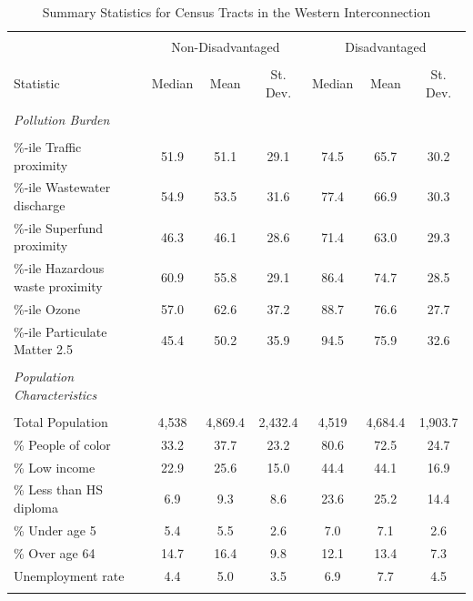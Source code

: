 \begin{table}[!htbp] \centering 
    \caption{Summary Statistics for Census Tracts in the Western Interconnection \label{dac_summary}} 
    \footnotesize
  \begin{tabular}{@{\extracolsep{3pt}}lcccccc} 
  \\[-1.8ex]\hline 
  \hline \\[-1.8ex] 
  & \multicolumn{3}{c}{Non-Disadvantaged} & \multicolumn{3}{c}{Disadvantaged} \\
    \cline{2-4} \cline{5-7}\\
  Statistic & Median & Mean & St. Dev. & Median & Mean & St. Dev.\\ 
  \hline \\ [-.8ex] 
    \emph{Pollution Burden} \\
    \hline \\[-.8ex]
    \%-ile Traffic proximity & 51.9 & 51.1 & 29.1 & 74.5 & 65.7 & 30.2 \\ 
    \%-ile Wastewater discharge & 54.9 & 53.5 & 31.6 & 77.4 & 66.9 & 30.3 \\  
    \%-ile Superfund proximity & 46.3 & 46.1 & 28.6 & 71.4 & 63.0 & 29.3 \\
    \%-ile Hazardous waste proximity & 60.9 & 55.8 & 29.1 & 86.4 & 74.7 & 28.5 \\ 
    \%-ile Ozone & 57.0 & 62.6 & 37.2  & 88.7 & 76.6 & 27.7 \\  
    \%-ile Particulate Matter 2.5 & 45.4 & 50.2 & 35.9  & 94.5 & 75.9 & 32.6 \\ \\[-.8ex]
    \emph{Population Characteristics} \\
    \hline \\[-.8ex]
    Total Population & 4,538 & 4,869.4 & 2,432.4 & 4,519 & 4,684.4 & 1,903.7 \\ 
    \% People of color & 33.2 & 37.7 & 23.2 & 80.6 & 72.5 & 24.7 \\  
    \% Low income & 22.9 & 25.6 & 15.0 & 44.4 & 44.1 & 16.9 \\ 
    \% Less than HS diploma & 6.9 & 9.3 & 8.6 & 23.6 & 25.2 & 14.4 \\ 
    \% Under age 5 & 5.4 & 5.5 & 2.6 & 7.0 & 7.1 & 2.6 \\ 
    \% Over age 64 & 14.7 & 16.4 & 9.8 & 12.1 & 13.4 & 7.3 \\ 
    Unemployment rate & 4.4 & 5.0 & 3.5 & 6.9 & 7.7 & 4.5 \\ 
  \hline \\[-1.8ex] 
  \end{tabular} 
\end{table} 

